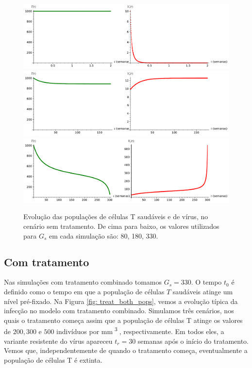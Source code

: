 \begin{figure}[ht!]
    \includegraphics[width=\textwidth]{figuras/cenario_1.pdf}
    \includegraphics[width=\textwidth]{figuras/cenario_2.pdf}
    \includegraphics[width=\textwidth]{figuras/cenario_3.pdf}
    \caption{Evolução das populações de células T saudáveis e de vírus, no cenário sem tratamento.
    De cima para baixo, os valores utilizados para \( G_{ s } \) em cada simulação são: 80, 180, 330.}
    \label{fig: no_treat_scenarios}
\end{figure}

\subsection{Com tratamento}

Nas simulações com tratamento combinado tomamos \( G_{ s } = 330 \).
O tempo \( t_{ 0 } \) é definido como o tempo em que a população de células \( T \) saudáveis atinge um nível pré-fixado.
Na Figura \ref{fig: treat_both_pops}, vemos a evolução típica da infecção no modelo com tratamento combinado.
Simulamos três cenários, nos quais o tratamento começa assim que a população de células T atinge os valores de \( 200, 300 \) e \( 500 \) indivíduos por \unit{mm^{ 3 }}, respectivamente.
Em todos eles, a variante resistente do vírus apareceu \( t_{ r } = 30 \) semanas após o início do tratamento.
Vemos que, independentemente de quando o tratamento começa, eventualmente a população de células T é extinta.

